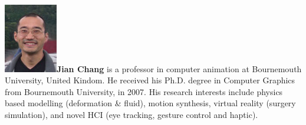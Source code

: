 \documentclass[VANCOUVER,STIX1COL]{WileyNJD-v2}
\begin{document}
\vspace{7ex}

\begin{biography}{\includegraphics[width=66pt,height=86pt]{VANCOUVER/figure/photos/JianChang.jpg}}{\textbf{Jian Chang} is a professor in  computer animation at Bournemouth University, United Kindom. He received his Ph.D. degree in Computer Graphics from Bournemouth University, in 2007. His research interests include physics based modelling (deformation \& fluid), motion synthesis, virtual reality (surgery simulation), and novel HCI (eye tracking, gesture control and haptic).}
\end{biography}

\vspace{5ex}
\end{document}
